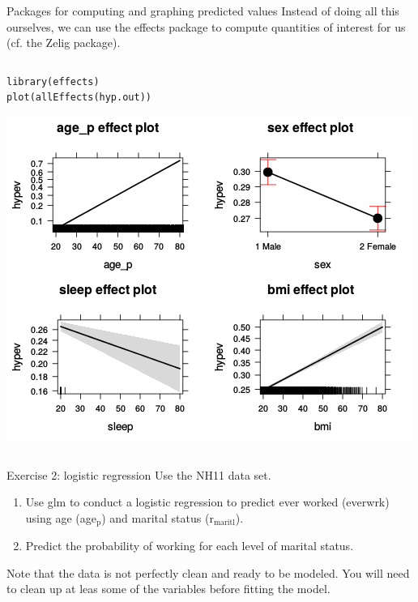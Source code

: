 \documentclass[table,smaller]{beamer}
\begin{document}
\begin{frame}[fragile,label=sec-4-5]{Packages for  computing and graphing predicted values}
 Instead of doing all this ourselves, we can use the effects package to compute quantities of interest for us (cf. the Zelig package).

\begin{columns}  \begin{block}{}
\begin{verbatim}
library(effects)
plot(allEffects(hyp.out))
\end{verbatim}

\includegraphics[width=.9\linewidth]{images/effects1.png}
\end{block} \end{columns}
\end{frame}



\begin{frame}[label=sec-4-6]{Exercise 2: logistic regression}
Use the NH11 data set.

\begin{enumerate}
\item Use glm  to conduct a logistic regression to predict ever worked (everwrk) using age (age$_{\text{p}}$) and marital status (r$_{\text{maritl}}$).
\item Predict the probability of working for each level of marital status.
\end{enumerate}

Note that the data is not perfectly clean and ready to be modeled. You will need to clean up at leas some of the variables before fitting the model.
\end{frame}
\end{document}
